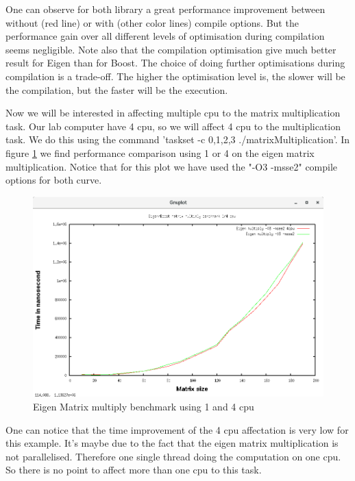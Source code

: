     One can observe for both library a great performance improvement between without (red line) or with (other color lines) compile options. But the performance gain over all different levels of optimisation during compilation seems negligible. Note also that the compilation optimisation give much better result for Eigen than for Boost.
    The choice of doing further optimisations during compilation is a trade-off. The higher the optimisation level is, the slower will be the compilation, but the faster will be the execution. 
    
\hspace{20px}
    
    Now we will be interested in affecting multiple cpu to the matrix multiplication task. Our lab computer have 4 cpu, so we will affect 4 cpu to the multiplication task. We do this using the command 'taskset -c 0,1,2,3 ./matrixMultiplication'. In figure \ref{cpu} we find performance comparison using 1 or 4 on the eigen matrix multiplication. Notice that for this plot we have used the "-O3 -msse2" compile options for both curve.

    \begin{figure}[h!]
    \includegraphics[width=\linewidth]{benchmark_eigen_cpu.png}
    \caption{Eigen Matrix multiply benchmark using 1 and 4 cpu}
    \label{cpu}
    \end{figure}
    One can notice that the time improvement of the 4 cpu affectation is very low for this example. It's maybe due to the fact that the eigen matrix multiplication is not parallelised. Therefore one single thread doing the computation on one cpu. So there is no point to affect more than one cpu to this task. 
    
